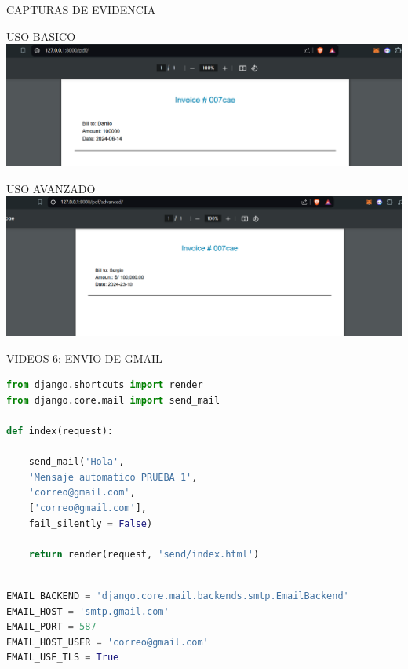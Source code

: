 \documentclass{article}
\begin{document}
        \item CAPTURAS DE EVIDENCIA
        \item USO BASICO
        \newline \newline\newline\newline 
        \includegraphics[width=1\textwidth,keepaspectratio]{IMAGENES/Evidencia Quinto video I.png}
        \newline \newline\newline
        \item USO AVANZADO
        \newline \newline\newline\newline 
        \includegraphics[width=1\textwidth,keepaspectratio]{IMAGENES/Evidencia Quinto video II.png}
        \newline \newline\newline

        \item VIDEOS 6: ENVIO DE GMAIL
        \begin{lstlisting}[language=Python, caption=views.py]
from django.shortcuts import render
from django.core.mail import send_mail

def index(request):

    send_mail('Hola',
    'Mensaje automatico PRUEBA 1', 
    'correo@gmail.com',
    ['correo@gmail.com'],
    fail_silently = False)

    return render(request, 'send/index.html')

        \end{lstlisting}  
        \begin{lstlisting}[language=Python, caption=settings.py]

EMAIL_BACKEND = 'django.core.mail.backends.smtp.EmailBackend'
EMAIL_HOST = 'smtp.gmail.com'
EMAIL_PORT = 587
EMAIL_HOST_USER = 'correo@gmail.com'
EMAIL_USE_TLS = True    

        \end{lstlisting}  
\end{document}
